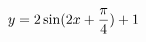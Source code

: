 \documentclass[preview]{standalone}
\begin{document}
\begin{align*}
\special{dvisvgm:raw <g id='unique000'>}y=2\sin(2x+\frac{\pi}{4})+1\special{dvisvgm:raw </g>}
\end{align*}
\end{document}
